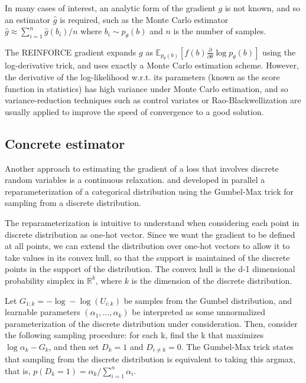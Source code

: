 \documentclass{article}
\newcommand{\discreteDist}{p_{\theta}(b)}
\newcommand{\loss}{f(b)}
\newcommand{\lossGrad}{\loss{} \frac{\partial}{\partial \theta }\log \discreteDist{}}
\newcommand{\mcGrad}{\hat{g}}
\newcommand{\expectedLossLogTrick}{\mathbb{E}_{\discreteDist{}}[\lossGrad{}]}
\begin{document}
In many cases of interest, an analytic form of the gradient $g$ is not known, and so an estimator $\mcGrad{}$ is required, such as the Monte Carlo estimator $\mcGrad{}\approx \sum_{i=1}^n\hat{g}(b_i) / n$ where $b_i\sim \discreteDist{}$ and $n$ is the number of samples. 


The REINFORCE gradient \cite{williams1992simple} expands $g$ as $\expectedLossLogTrick{}$ using the log-derivative trick, and uses exactly a Monte Carlo estimation scheme. 
However, the derivative of the log-likelihood w.r.t. its parameters (known as the score function in statistics) has high variance under Monte Carlo estimation, and so variance-reduction techniques such as control variates or Rao-Blackwellization are usually applied to improve the speed of convergence to a good solution.

\subsection{Concrete estimator}

Another approach to estimating the gradient of a loss that involves discrete random variables is a continuous relaxation. 
\cite{maddison2016concrete} and \cite{jang2016categorical} developed in parallel a reparameterization of a categorical distribution using the Gumbel-Max trick for sampling from a discrete distribution.

The reparameterization is intuitive to understand when considering each point in discrete distribution as one-hot vector.
Since we want the gradient to be defined at all points, we can extend the distribution over one-hot vectors to allow it to take values in its convex hull, so that the support is maintained of the discrete points in the support of the distribution.
The convex hull is the d-1 dimensional probability simplex in $\mathbb{R}^k$, where $k$ is the dimension of the discrete distribution.

Let $G_{1:k} = -\log-\log(U_{i:k})$ be samples from the Gumbel distribution, and learnable parameters $(\alpha_1, \dots, \alpha_k)$ be interpreted as some unnormalized parameterization of the discrete distribution under consideration.
Then, consider the following sampling procedure: for each k, find the k that maximizes $\log \alpha_k - G_k$, and then set $D_k=1$ and $D_{i \neq k} = 0$. The Gumbel-Max trick states that sampling from the discrete distribution is equivalent to taking this argmax, that is, $p(D_k = 1) = \alpha_k / \sum_{i=1}^n \alpha_i$.
\end{document}
